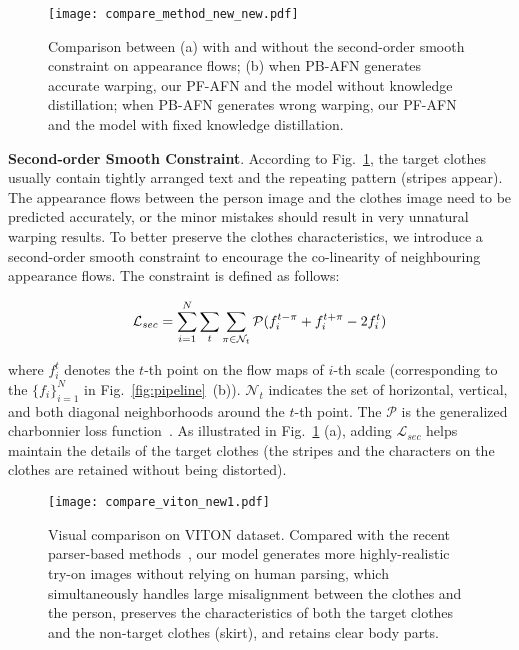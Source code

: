 \documentclass[final]{cvpr}
\begin{document}
	
	
	
	\begin{figure}[t]
		\begin{center}
\texttt{[image: compare\_method\_new\_new.pdf]}
		\end{center}
		\caption{Comparison between (a) with and without the second-order smooth constraint on appearance flows; (b) when PB-AFN generates accurate warping, our PF-AFN and the model without knowledge distillation; when PB-AFN generates wrong warping, our PF-AFN and the model with fixed knowledge distillation.}
		\vspace{-10pt}
		\label{fig:method_compare}
	\end{figure}
	
	
	
	\textbf{Second-order Smooth Constraint}.
According to Fig.~\ref{fig:method_compare}, the target clothes usually contain tightly arranged text and the repeating pattern (\eg stripes appear). 
The appearance flows between the person image and the clothes image need to be predicted accurately, or the minor mistakes should result in very unnatural warping results.
To better preserve the clothes characteristics, we introduce a second-order smooth constraint to encourage the co-linearity of neighbouring appearance flows.
The constraint is defined as follows:
\begin{small}
		\begin{equation}	
			\setlength\abovedisplayskip{4pt}\setlength\belowdisplayskip{4pt}
			\mathcal{L}_{sec} = \sum_{i=1}^N\sum_{t}\sum_{\pi\in \mathcal{N}_t}\mathcal{P}( f_i^{t-\pi}  + f_i^{t+\pi} - 2f_i^t )
		\end{equation}
	\end{small}
where $f_i^t$ denotes the $t$-th point on the flow maps of $i$-th scale (\ie corresponding to the $\{f_i\}_{i=1}^N$ in Fig.~\ref{fig:pipeline}~(b)).
$ \mathcal{N}_t$ indicates the set of horizontal, vertical, and both diagonal neighborhoods around the $t$-th point. 
The $\mathcal{P}$ is the generalized charbonnier loss function~\cite{loss}.  
As illustrated in Fig.~\ref{fig:method_compare} (a), adding $\mathcal{L}_{sec}$ helps maintain the details of the target clothes (\ie the stripes and the characters on the clothes are retained without being distorted).
	
	
	
	
	
	
	\begin{figure*}
		\begin{center}
			\texttt{[image: compare\_viton\_new1.pdf]}
		\end{center}
		\vspace{-3mm}
		\caption{Visual comparison on VITON dataset. Compared with the recent parser-based methods~\cite{cpvton,clothflow,cpvton_plus,ACGPN}, our model generates more highly-realistic try-on images without relying on human parsing, which simultaneously handles large misalignment between the clothes and the person, preserves the characteristics of both the target clothes and the non-target clothes (\ie skirt), and retains clear body parts.}
		\vspace{-10pt}
		\label{fig:vis_viton}
	\end{figure*}
	
\end{document}
